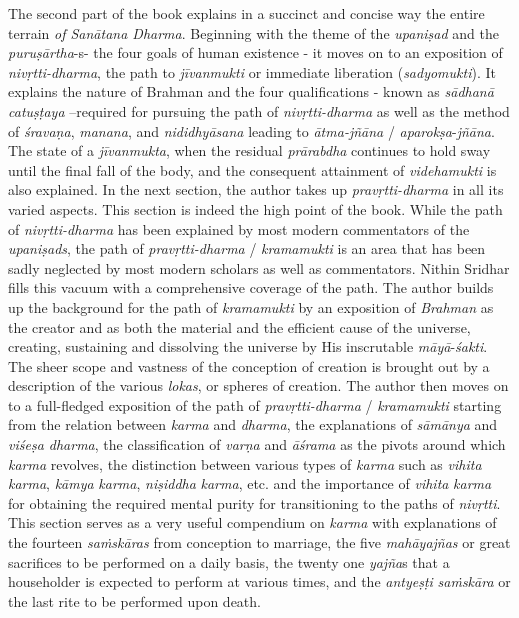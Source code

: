 The second part of the book explains in a succinct and concise way the entire terrain \emph{of Sanātana Dharma}. Beginning with the theme of the \emph{upaniṣad} and the \emph{puruṣārtha}-s- the four goals of human existence - it moves on to an exposition of \emph{nivṛtti-dharma}, the path to \emph{jīvanmukti} or immediate liberation (\emph{sadyomukti}). It explains the nature of Brahman and the four qualifications - known as \emph{sādhanā} \emph{catuṣṭaya} --required for pursuing the path of \emph{nivṛtti-dharma} as well as the method of \emph{śravaṇa}, \emph{manana}, and \emph{nididhyāsana} leading to \emph{ātma-jñāna} / \emph{aparokṣa}-\emph{jñāna}. The state of a \emph{jīvanmukta}, when the residual \emph{prārabdha} continues to hold sway until the final fall of the body, and the consequent attainment of \emph{videhamukti} is also explained. In the next section, the author takes up \emph{pravṛtti-dharma} in all its varied aspects. This section is indeed the high point of the book. While the path of \emph{nivṛtti-dharma} has been explained by most modern commentators of the \emph{upaniṣads}, the path of \emph{pravṛtti-dharma} / \emph{kramamukti} is an area that has been sadly neglected by most modern scholars as well as commentators. Nithin Sridhar fills this vacuum with a comprehensive coverage of the path. The author builds up the background for the path of \emph{kramamukti} by an exposition of \emph{Brahman} as the creator and as both the material and the efficient cause of the universe, creating, sustaining and dissolving the universe by His inscrutable \emph{māyā}-\emph{śakti}. The sheer scope and vastness of the conception of creation is brought out by a description of the various \emph{lokas}, or spheres of creation. The author then moves on to a full-fledged exposition of the path of \emph{pravṛtti-dharma} / \emph{kramamukti} starting from the relation between \emph{karma} and \emph{dharma}, the explanations of \emph{sāmānya} and \emph{viśeṣa dharma}, the classification of \emph{varṇa} and \emph{āśrama} as the pivots around which \emph{karma} revolves, the distinction between various types of \emph{karma} such as \emph{vihita} \emph{karma}, \emph{kāmya} \emph{karma}, \emph{niṣiddha} \emph{karma}, etc. and the importance of \emph{vihita} \emph{karma} for obtaining the required mental purity for transitioning to the paths of \emph{nivṛtti}. This section serves as a very useful compendium on \emph{karma} with explanations of the fourteen \emph{saṁskāras} from conception to marriage, the five \emph{mahāyajñas} or great sacrifices to be performed on a daily basis, the twenty one \emph{yajña}s that a householder is expected to perform at various times, and the \emph{antyeṣṭi} \emph{saṁskāra} or the last rite to be performed upon death.

